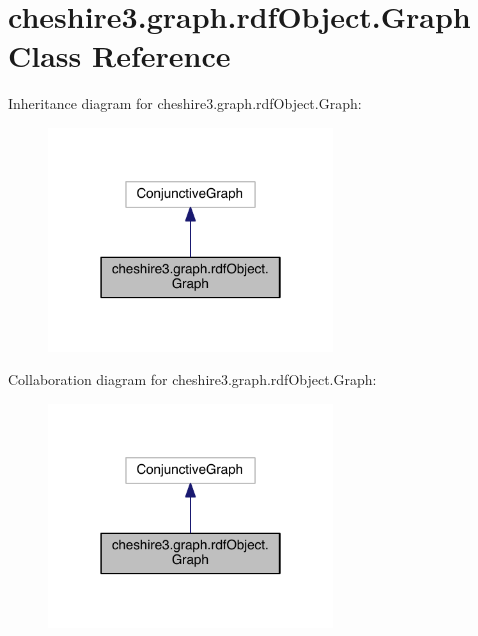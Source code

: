\hypertarget{classcheshire3_1_1graph_1_1rdf_object_1_1_graph}{\section{cheshire3.\-graph.\-rdf\-Object.\-Graph Class Reference}
\label{classcheshire3_1_1graph_1_1rdf_object_1_1_graph}
}


Inheritance diagram for cheshire3.\-graph.\-rdf\-Object.\-Graph\-:
\nopagebreak
\begin{figure}[H]
\begin{center}
\leavevmode
\includegraphics[width=214pt]{classcheshire3_1_1graph_1_1rdf_object_1_1_graph__inherit__graph}
\end{center}
\end{figure}


Collaboration diagram for cheshire3.\-graph.\-rdf\-Object.\-Graph\-:
\nopagebreak
\begin{figure}[H]
\begin{center}
\leavevmode
\includegraphics[width=214pt]{classcheshire3_1_1graph_1_1rdf_object_1_1_graph__coll__graph}
\end{center}
\end{figure}
